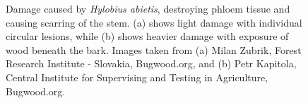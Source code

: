 \documentclass[a4paper, 11pt]{article}
\begin{document}
\begin{figure}
\centering
	\caption{Damage caused by \textit{Hylobius abietis}, destroying phloem tissue and causing scarring of the stem. (a) shows light damage with individual circular lesions, while (b) shows heavier damage with exposure of wood beneath the bark. Images taken from (a) Milan Zubrik, Forest Research Institute - Slovakia, Bugwood.org, and (b) Petr Kapitola, Central Institute for Supervising and Testing in Agriculture, Bugwood.org.}
	\label{damage}
\end{figure}
\end{document}
